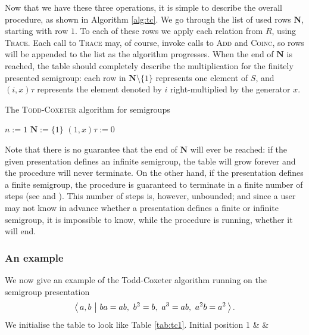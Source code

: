Now that we have these three operations, it is simple to describe the overall
procedure, as shown in Algorithm \ref{alg:tc}.  We go through the list of used
rows $\mathbf{N}$, starting with row $1$.  To each
of these rows we apply each relation from $R$, using \textsc{Trace}.  Each call
to \textsc{Trace} may, of course, invoke calls to \textsc{Add} and
\textsc{Coinc}, so rows will be appended to the list as the algorithm
progresses.  When the end of $\mathbf{N}$ is reached, the table should
completely describe the multiplication for the finitely presented semigroup:
each row in $\mathbf{N} \setminus \{1\}$ represents one element of $S$, and
$(i, x)\tau$ represents the element denoted by $i$ right-multiplied by the
generator $x$.

\begin{algorithm}
\caption{The \textsc{Todd-Coxeter} algorithm for semigroups}
\label{alg:tc}
\begin{algorithmic}[1]
\State $n := 1$
\State $\mathbf{N} := \{1\}$
  \State $(1, x)\tau := 0$
\EndFor
{}
    \State {}
  \EndFor
\EndFor
\EndProcedure
\end{algorithmic}
\end{algorithm}

Note that there is no guarantee that the end of $\mathbf{N}$ will ever be
reached: if the given presentation defines an infinite semigroup, the table will
grow forever and the procedure will never terminate.  On the other hand, if the
presentation defines a finite semigroup, the procedure is guaranteed to
terminate in a finite number of steps (see
\cite[Theorem 5.5]{cgt} and \cite[Theorem 3]{beetham_campbell_1976}).
This number of steps is, however, unbounded; and since a user may
not know in advance whether a presentation defines a finite or infinite
semigroup, it is impossible to
know, while the procedure is running, whether it will end.

\subsubsection{An example}
We now give an example of the Todd-Coxeter algorithm running on the semigroup
presentation
$$\pres{a, b}{ba=ab,\ b^2=b,\ a^3=ab,\ a^2b=a^2}.$$
We initialise the table to look like Table \ref{tab:tc1}.
{Initial position}
{ 1 & & \\ }

